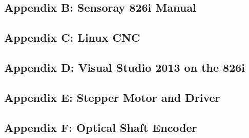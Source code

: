 \documentclass[12pt]{article}
\begin{document}
\clearpage

\subsection*{Appendix B: Sensoray 826i Manual}

\clearpage

%


\subsection*{Appendix C: Linux CNC}



%

%

%


\subsection*{Appendix D: Visual Studio 2013 on the 826i}



%


\subsection*{Appendix E: Stepper Motor and Driver}



%

%


\subsection*{Appendix F: Optical Shaft Encoder}

%
\end{document}
